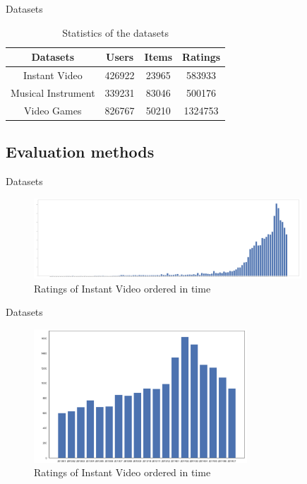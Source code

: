 \documentclass{beamer}
\begin{document}
\begin{frame}{Datasets}

\begin{table}[]
    \centering
    \begin{tabular}{cccc}
    \toprule  
    Datasets & Users & Items & Ratings\\
    \midrule  
    Instant Video & 426922 & 23965 & 583933  \\
    Musical Instrument & 339231 & 83046 & 500176  \\
    Video Games & 826767 & 50210 & 1324753  \\
    \bottomrule
    \end{tabular}
    \caption{Statistics of the datasets}
\end{table}

\subsection{Evaluation methods}
    
    
\end{frame}










\begin{frame}{Datasets}


\begin{figure}
\includegraphics[height=3cm]{figure1.png}
\caption{Ratings of Instant Video ordered in time}
\end{figure}


\end{frame}










\begin{frame}{Datasets}


\begin{figure}
\includegraphics[height=5cm]{figure2.png}
\caption{Ratings of Instant Video ordered in time}
\end{figure}


\end{frame}
\end{document}
